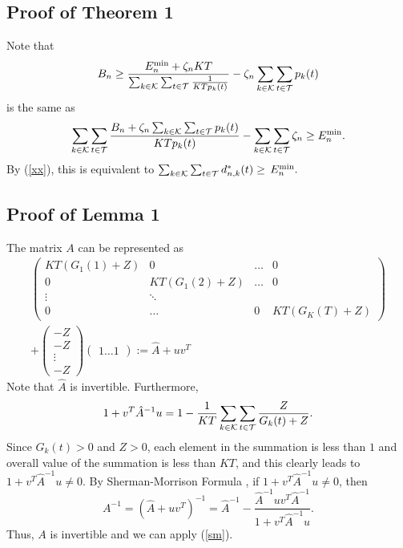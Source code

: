 \subsection{Proof of Theorem 1} Note that \begin{equation*}
    B_n \geq \frac{E_n^{\min}+\zeta_nKT}{\sum_{k\in {\cal K}}\sum_{t\in {\cal T}}\frac{1}{KTp_k(t)}}-\zeta_n \sum_{k\in {\cal K}}\sum_{t\in {\cal T}}p_k(t)
\end{equation*}
is the same as \begin{equation*}
\sum_{k\in {\cal K}}\sum_{t\in {\cal T}}\frac{B_n+\zeta_n \sum_{k\in {\cal K}}\sum_{t\in {\cal T}}p_k(t)}{KTp_k(t)}- \sum_{k\in {\cal K}}\sum_{t\in {\cal T}}\zeta_n \geq E_n^{\min}.\end{equation*}
By (\ref{xx}), this is equivalent to 
$\sum_{k\in {\cal K}}\sum_{t\in {\cal T}}d^*_{n,k}(t)\geq \,E^{\min}_n.$


\subsection{Proof of Lemma 1} The matrix $A$ can be represented as 
{\footnotesize{\begin{equation*}\begin{split} \begin{pmatrix}
KT(G_1(1)+Z)& 0&\dots& 0\\
0 & KT(G_1(2)+Z)& \dots& 0\\
\vdots & \ddots\\
0 &\dots&0 & KT(G_K(T)+Z)
\end{pmatrix}\\+\begin{pmatrix}
-Z\\
-Z\\
\vdots \\
-Z
\end{pmatrix}\begin{pmatrix}
1 \dots 1
\end{pmatrix}:=\hat{A}+uv^T\end{split}\end{equation*}}}
Note that $\hat{A}$ is invertible. Furthermore, 
\begin{equation*}
1+v^T\hat{A}^{-1}u=1-\frac{1}{KT}\sum_{k\in {\cal K}}\sum_{t\in {\cal T}}\frac{Z}{G_k(t)+Z}.
\end{equation*}
Since $G_k(t)>0$ and $Z>0$, each element in the summation is less than $1$ and overall value of the summation is less than $KT$, and this clearly leads to $1+v^T\hat{A}^{-1}u\neq0$. By Sherman-Morrison Formula \cite{SM},  if $1+v^T\hat{A}^{-1}u\neq0$, then \begin{equation}A^{-1}=(\hat{A}+uv^T)^{-1}=\hat{A}^{-1}-\frac{\hat{A}^{-1}uv^T\hat{A}^{-1}}{1+v^T\hat{A}^{-1}u}. \label{sm} \end{equation}
Thus, $A$ is invertible and we can apply (\ref{sm}).


